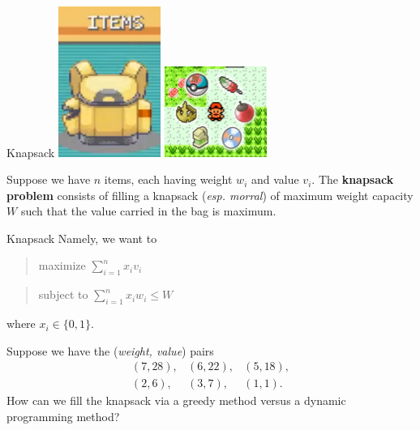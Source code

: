 \documentclass{beamer}
\begin{document}
\begin{frame}{Knapsack}
	\includegraphics[width=0.25\textwidth]{pokebag.png}
	\hspace{1cm}
	\includegraphics[width=0.25\textwidth]{pokeitems.png}

	\bigskip
	Suppose we have $n$ items, each having weight $w_i$ and value $v_i$. The
	\textbf{knapsack problem} consists of filling a knapsack (\emph{esp. morral})
	of maximum weight capacity $W$ such that the value carried in the bag is
	maximum.
\end{frame}

%

\begin{frame}{Knapsack}
	Namely, we want to

	\bigskip
	\begin{quote}
		maximize $\sum_{i= 1}^n x_iv_i$ 
	\end{quote}
	
	\begin{quote}
		subject to $\sum_{i= 1}^n x_iw_i \leq W$
	\end{quote}
	where $x_i \in \{0,1\}$. \pause

	\begin{exl}
		Suppose we have the (\emph{weight, value}) pairs
		\[
			\begin{array}{lll}
				(7, 28), & (6, 22), & (5, 18),\\
				(2, 6), & (3, 7), & (1, 1).
			\end{array}
		\] \pause
		How can we fill the knapsack via a greedy method versus a dynamic
		programming method?
	\end{exl}
\end{frame}
\end{document}
